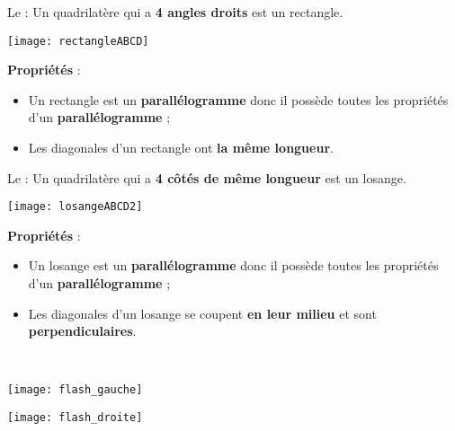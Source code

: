 \begin{minipage}[t]{0.49\linewidth}
  \begin{definition}
   Le  :
   Un quadrilatère qui a \textcolor{C2}{\textbf{4 angles droits}} est un rectangle.
   
    \begin{center}\texttt{[image: rectangleABCD]}\end{center}
    
   \textcolor{H1}{\textbf{Propriétés}} :
    \begin{itemize}
     \item Un rectangle est un \textcolor{H1}{\textbf{parallélogramme}} donc il possède toutes les propriétés d'un \textcolor{H1}{\textbf{parallélogramme}} ;
     \item Les diagonales d'un rectangle ont \textcolor{H1}{\textbf{la même longueur}}.
     \end{itemize}
   \end{definition}
 \end{minipage}
 \begin{minipage}[t]{0.59\linewidth}
   \begin{definition}
   Le  :
   Un quadrilatère qui a \textcolor{C2}{\textbf{4 côtés de même longueur}} est un losange.
   
     \begin{center}\texttt{[image: losangeABCD2]}\end{center}
    
   \textcolor{H1}{\textbf{Propriétés}} :
    \begin{itemize}
     \item Un losange est un \textcolor{H1}{\textbf{parallélogramme}} donc il possède toutes les propriétés d'un \textcolor{H1}{\textbf{parallélogramme}} ;
     \item Les diagonales d'un losange se coupent \textcolor{H1}{\textbf{en leur milieu}} et sont \textcolor{H1}{\textbf{perpendiculaires}}.
     \end{itemize}
   \end{definition}
  \end{minipage} \\
  
\begin{minipage}[t]{0.49\linewidth}
\begin{center} \texttt{[image: flash\_gauche]} \end{center}
 \end{minipage}
 \begin{minipage}[t]{0.49\linewidth}
\begin{center} \texttt{[image: flash\_droite]} \end{center}
 \end{minipage} \\ [-2em]
  
